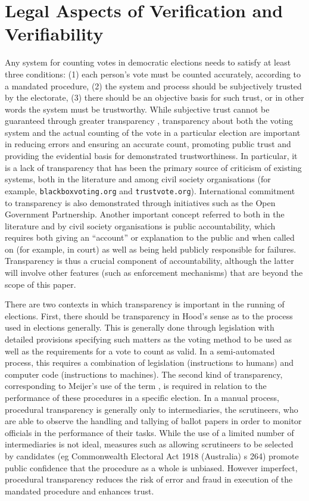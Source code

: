 \documentclass{llncs}
\begin{document}
\section{Legal Aspects of Verification and Verifiability}


Any system for counting votes in democratic elections needs to
satisfy at least three conditions: (1) each person's vote must be
counted accurately, according to a mandated procedure, (2) the
system and process should be subjectively trusted by the electorate,
(3) there should be an objective basis for such trust, or in other
words the system must be trustworthy. While subjective trust cannot
be guaranteed through greater transparency \cite{ONeill:2002:QT}, transparency about
both the voting system and the actual counting of the vote in a
particular election are important in reducing errors and ensuring an
accurate count, promoting public trust and providing the evidential
basis for demonstrated trustworthiness. In particular, it is a lack
of transparency that has been the primary source of criticism of
existing systems, both in the literature
\cite{Carrier:2012:VCT,Conway:2017:ANS} and among civil
society organisations \cite{Vogl:2012:WWC} (for example,
\texttt{blackboxvoting.org} and
\texttt{trustvote.org}). International commitment to transparency is also
demonstrated through initiatives such as the Open Government
Partnership. Another important concept referred to both in the
literature and by civil society organisations is public
accountability, which requires both giving an “account” or
explanation to the public and when called on (for example, in court)
as well as being held publicly responsible for failures.
Transparency is thus a crucial component of accountability, although
the latter will involve other features (such as enforcement
mechanisms) that are beyond the scope of this paper. 

There are two contexts in which transparency is important in the
running of elections. First, there should be transparency in Hood's
sense \cite{Hood:2001:T} as to the process used in elections generally. This is
generally done through legislation with detailed provisions
specifying such matters as the voting method to be used 
 as well as the requirements for a vote to count as valid.
In a semi-automated process, this requires a combination of
legislation (instructions to humans) and computer code (instructions
to machines). The second kind of transparency, corresponding to
Meijer’s use of the term \cite{Meijer:2014:T}, is required in relation to the
performance of these procedures in a specific election. In a manual
process, procedural transparency is generally only to
intermediaries, the scrutineers, who are able to observe the
handling and tallying of ballot papers in order to monitor officials
in the performance of their tasks. While the use of a limited number
of intermediaries is not ideal, measures such as allowing
scrutineers to be selected by candidates (eg Commonwealth Electoral
Act 1918 (Australia) s 264) promote public confidence that the
procedure as a whole is unbiased. However imperfect, procedural
transparency reduces the risk of error and fraud in execution of the
mandated procedure and enhances trust. 
\end{document}
